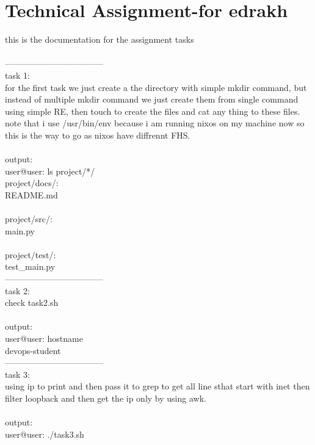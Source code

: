 \documentclass[a4paper,14pt]{extarticle}
\author{}
\date{}
\begin{document}
\noindent
\newpage

\section*{Technical Assignment-for edrakh}
this is the documentation for the assignment tasks\\
\\
-----------------------------------\\
task 1:\\
for the first task we just create a the directory with simple mkdir command, but instead of multiple mkdir command we just create them from single command using simple RE, then touch to create the files and cat any thing to these files.\\
note that i use /usr/bin/env because i am running nixos on my machine now so this is the way to go as nixos have diffrennt FHS.\\
\\
output:\\
user@user:  ls project/*/\\
project/docs/:\\
README.md\\
\\
project/src/:\\
main.py\\
\\
project/test/:\\
test\_main.py\\
-----------------------------------\\
task 2:\\
check task2.sh\\
\\
output:\\
user@user:  hostname\\
devops-student\\
-----------------------------------\\
task 3:\\
using ip to print and then pass it to grep to get all line sthat start with inet then filter loopback and then get the ip only by using awk.\\
\\
output:\\
user@user:  ./task3.sh\\
\end{document}
